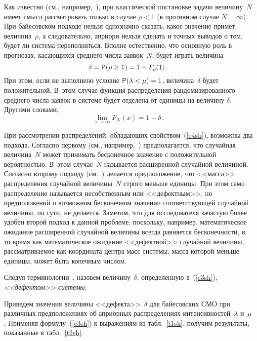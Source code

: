 \begin{multicols}{2}
Как известно (см., например,~\cite{BoPe95}), при классической постановке задачи величину~$N$ имеет смысл рассматривать
только в случае $\rho<1$ (в противном случае $N=\infty$). При байесовском подходе нельзя однозначно сказать, какое
значение примет величина~$\rho$, а следовательно, априори нельзя сделать и точных выводов о том, будет ли система
переполняться. Вполне естественно, что основную роль в прогнозах, касающихся среднего числа заявок~$N$, будет играть
величина
\begin{equation}
\delta={\sf P}(\rho\ge1)=1-F_\rho(1)\,.
\label{e3sh}
\end{equation}
При этом, если не выполнено условие ${\sf P}(\lambda<\mu)=1$, величина~$\delta$ будет положительной. В~этом случае функция
распределения рандомизированного среднего числа заявок в системе будет отделена от единицы на величину $\delta$.
Другими словами,
\begin{equation}
\lim_{x\to\infty}F_N(x)=1-\delta\,.
\label{e4sh}
\end{equation}

При рассмотрении распределений, обладающих свойством~(\ref{e4sh}), возможны два подхода. Согласно первому (см., 
например,~\cite{Shiryaev80}) предполагается, что случайная величина~$N$ может принимать бесконечное значение с положительной
вероятностью. В~этом случае~$N$ называется расширенной случайной величиной. Согласно второму подходу 
(см.~\cite{Feller67}) делается предположение, что <<масса>> распределения случайной величины~$N$ строго 
меньше единицы. При
этом само распределение называется несобственным или <<дефектным>>, но предположений о возможном бесконечном значении
соответствующей случайной величины, по сути, не делается. Заметим, что для исследователя зачастую более удобен второй
подход к данной проблеме, поскольку, например, математическое ожидание расширенной случайной величины всегда равняется
бесконечности, в то время как математическое ожидание <<дефектной>> случайной величины, рассматриваемое как координата
центра масс системы, масса которой меньше единицы, может быть конечным числом.

Следуя терминологии~\cite{Feller67}, назовем величину~$\delta$, определенную в~(\ref{e3sh}), 
\textit{<<дефектом>> системы}.

Приведем значения величины <<дефекта>>~$\delta$ для байесовских СМО при различных предположениях об априорных
распределениях интенсивностей~$\lambda$ и~$\mu$. 
Применяя формулу~(\ref{e3sh}) к выражениям из табл.~\ref{t1sh}, 
получим результаты, показанные в табл.~\ref{t2sh}.


\end{multicols}

